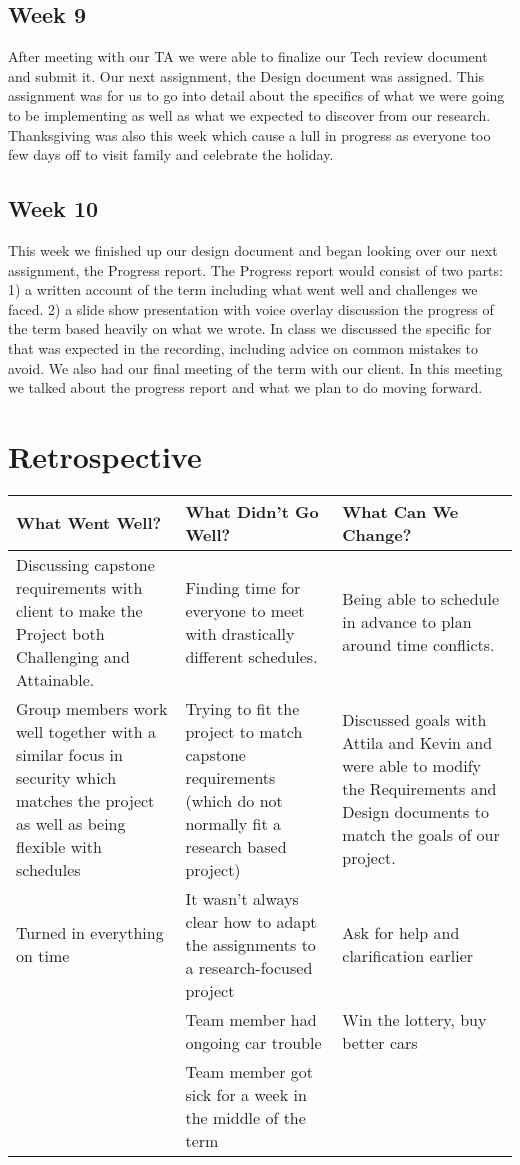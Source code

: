 \documentclass[onecolumn, draftclsnofoot,10pt, compsoc]{IEEEtran}
\begin{document}
\subsection{Week 9} %
After meeting with our TA we were able to finalize our Tech review document and submit it. Our next assignment, the Design document was assigned. This assignment was for us to go into detail about the specifics of what we were going to be implementing as well as what we expected to discover from our research. Thanksgiving was also this week which cause a lull in progress as everyone too few days off to visit family and celebrate the holiday. 



\subsection{Week 10} %
This week we finished up our design document and began looking over our next assignment, the Progress report. The Progress report would consist of two parts: 1) a written account of the term including what went well and challenges we faced. 2) a slide show presentation with voice overlay discussion the progress of the term based heavily on what we wrote. In class we discussed the specific for that was expected in the recording, including advice on common mistakes to avoid. We also had our final meeting of the term with our client. In this meeting we talked about the progress report and what we plan to do moving forward. 

\section {Retrospective}

\begin{tabular} {p{6cm} | p{6cm}  | p{6cm} }
\hline
\textbf{What Went Well?} & \textbf{What Didn't Go Well?} & \textbf{What Can We Change?} \\
\hline
Discussing capstone requirements with client to make the Project both Challenging and Attainable. & Finding time for everyone to meet with drastically different schedules.
 & Being able to schedule in advance to plan around time conflicts. \\ 
 \hline
Group members work well together with a similar focus in security which matches the project as well as being flexible with schedules & Trying to fit the project to match capstone requirements (which do not normally fit a research based project)  & Discussed goals with Attila and Kevin and were able to modify the Requirements and Design documents to match the goals of our project. \\
\hline
Turned in everything on time & It wasn't always clear how to adapt the assignments to a research-focused project & Ask for help and clarification earlier \\
\hline
& Team member had ongoing car trouble & Win the lottery, buy better cars \\
\hline
& Team member got sick for a week in the middle of the term &  \\
\hline
\end {tabular}
\end{document}
